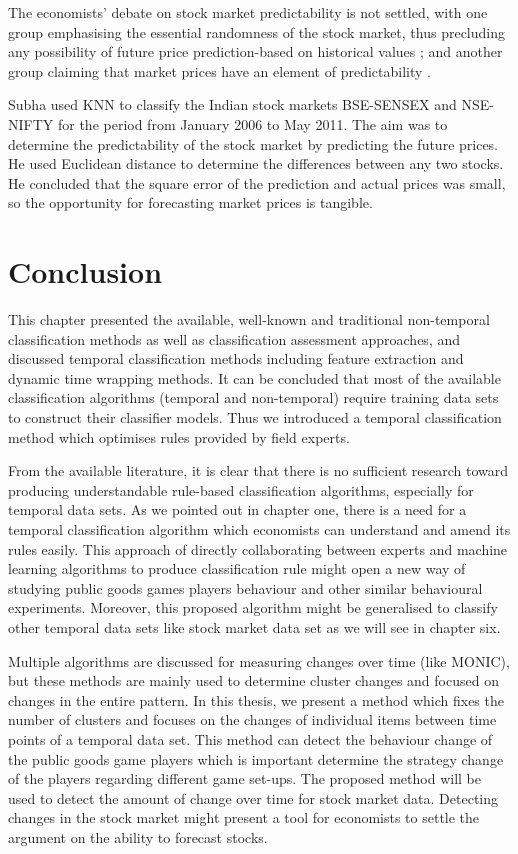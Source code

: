 The economists' debate on stock market predictability is not settled, with one group emphasising the essential randomness of the stock market, thus precluding any possibility of future price prediction-based on historical values \cite{Fama1965}; and another group claiming that market prices have an element of predictability \cite{Lo1988}.

Subha \cite{Subha2012} used KNN to classify the Indian stock markets BSE-SENSEX and NSE-NIFTY for the period from January 2006 to May 2011. The aim was to determine the predictability of the stock market by predicting the future prices. He used Euclidean distance to determine the differences between any two stocks. He concluded that the square error of the prediction and actual prices was small, so the opportunity for forecasting market prices is tangible. 



\section{Conclusion}

This chapter presented the available, well-known and traditional non-temporal classification methods as well as classification assessment approaches, and discussed temporal classification methods including feature extraction and dynamic time wrapping methods. It can be concluded that most of the available classification algorithms (temporal and non-temporal) require training data sets to construct their classifier models. Thus we introduced a temporal classification method which optimises rules provided by field experts.

From the available literature, it is clear that there is no sufficient research toward producing understandable rule-based classification algorithms, especially for temporal data sets. As we pointed out in chapter one, there is a need for a temporal classification algorithm which economists can understand and amend its rules easily. This approach of directly collaborating between experts and machine learning algorithms to produce classification rule might open a new way of studying public goods games players behaviour and other similar behavioural experiments. Moreover, this proposed algorithm might be generalised to classify other temporal data sets like stock market data set as we will see in chapter six.

Multiple algorithms are discussed for measuring changes over time (like MONIC), but these methods are mainly used to determine cluster changes and focused on changes in the entire pattern. In this thesis, we present a method which fixes the number of clusters and focuses on the changes of individual items between time points of a temporal data set. This method can detect the behaviour change of the public goods game players which is important determine the strategy change of the players regarding different game set-ups. The proposed method will be used to detect the amount of change over time for stock market data. Detecting changes in the stock market might present a tool for economists to settle the argument on the ability to forecast stocks.

